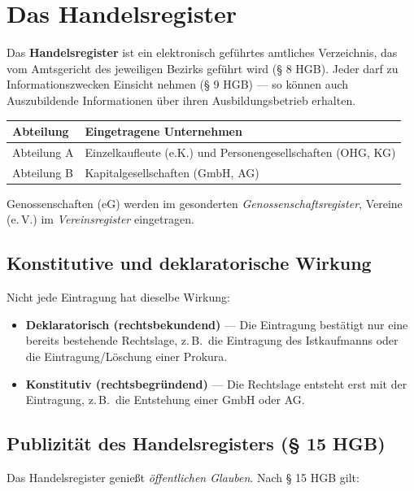 \documentclass[11pt, a4paper]{article}
\begin{document}
\section{Das Handelsregister}

Das \textbf{Handelsregister} ist ein elektronisch geführtes amtliches Verzeichnis, das
vom Amtsgericht des jeweiligen Bezirks geführt wird (§ 8 HGB). Jeder darf zu
Informationszwecken Einsicht nehmen (§ 9 HGB) --- so können auch Auszubildende
Informationen über ihren Ausbildungsbetrieb erhalten.

\begin{center}
\begin{tabular}{p{3.2cm} p{9.4cm}}
\toprule
\textbf{Abteilung} & \textbf{Eingetragene Unternehmen}\\
\midrule
Abteilung A & Einzelkaufleute (e.K.) und Personengesellschaften (OHG, KG)\\
Abteilung B & Kapitalgesellschaften (GmbH, AG)\\
\bottomrule
\end{tabular}
\end{center}

\medskip
Genossenschaften (eG) werden im gesonderten \emph{Genossenschaftsregister}, Vereine
(e.\,V.) im \emph{Vereinsregister} eingetragen.

\subsection{Konstitutive und deklaratorische Wirkung}

Nicht jede Eintragung hat dieselbe Wirkung:

\begin{itemize}
  \item \textbf{Deklaratorisch (rechtsbekundend)} --- Die Eintragung bestätigt nur eine
    bereits bestehende Rechtslage, z.\,B.\ die Eintragung des Istkaufmanns oder die
    Eintragung/Löschung einer Prokura.
  \item \textbf{Konstitutiv (rechtsbegründend)} --- Die Rechtslage entsteht erst mit der
    Eintragung, z.\,B.\ die Entstehung einer GmbH oder AG.
\end{itemize}

\subsection{Publizität des Handelsregisters (§ 15 HGB)}

Das Handelsregister genießt \emph{öffentlichen Glauben}. Nach § 15 HGB gilt:
\end{document}
